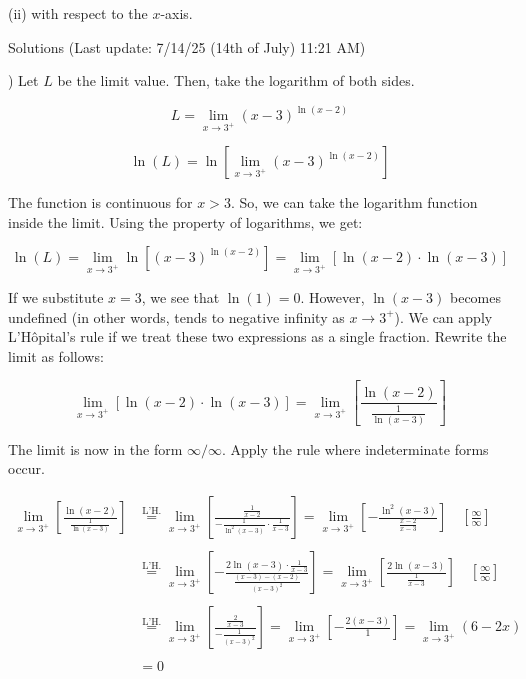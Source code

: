 \documentclass{article}
\begin{document}
\noindent (ii) with respect to the $x$-axis.

\hfill

\newpage

\begin{center}
Solutions (Last update: 7/14/25 (14th of July) 11:21 AM)
\end{center}

) Let $L$ be the limit value. Then, take the logarithm of both sides.

\begin{equation*}L = \lim_{x\to3^+}(x-3)^{\ln(x-2)}\end{equation*}

\begin{equation*}\ln(L) = \ln\left[\lim_{x\to3^+}(x-3)^{\ln(x-2)}\right]\end{equation*}

\hfill

\noindent The function is continuous for $x > 3$. So, we can take the logarithm function inside the limit. Using the property of logarithms, we get:

\begin{equation*}\ln(L) = \lim_{x\to3^+}\ln\left[(x-3)^{\ln(x-2)}\right] = \lim_{x\to3^+}\left[\ln(x-2)\cdot \ln(x-3)\right]\end{equation*}

\hfill

\noindent If we substitute $x=3$, we see that $\ln(1) = 0$. However, $\ln(x-3)$ becomes undefined (in other words, tends to negative infinity as $x\to3^+$). We can apply L'Hôpital's rule if we treat these two expressions as a single fraction. Rewrite the limit as follows:

\begin{equation*}\lim_{x\to3^+}\left[\ln(x-2) \cdot \ln(x-3)\right] =\lim_{x\to3^+}\left[\frac{\ln(x-2)}{\frac{1}{\ln(x-3)}}\right]  \end{equation*}

\hfill

\noindent The limit is now in the form $\infty/\infty$. Apply the rule where indeterminate forms occur.

\begin{align*}
    \lim_{x\to3^+}\left[\frac{\ln(x-2)}{\frac{1}{\ln(x-3)}}\right] &\overset{\text{L'H.}}{=} \lim_{x\to3^+} \left[\frac{\frac{1}{x-2}}{-\frac{1}{\ln^2(x-3)}\cdot {\frac{1}{x-3}}}\right] = \lim_{x\to3^+} \left[-\frac{\ln^2(x-3)}{\frac{x-2}{x-3}}\right] \quad \left[\frac{\infty}{\infty}\right] \\\\
    &\overset{\text{L'H.}}{=} \lim_{x\to3^+}\left[-\frac{2\ln(x-3)\cdot\frac{1}{x-3}}{\frac{(x-3) -(x-2)}{(x-3)^2}}\right] = \lim_{x\to3^+} \left[\frac{2\ln(x-3)}{\frac{1}{x-3}}\right] \quad \left[\frac{\infty}{\infty}\right] \\\\
    &\overset{\text{L'H.}}{=} \lim_{x\to3^+} \left[\frac{\frac{2}{x-3}}{-\frac{1}{(x-3)^2}}\right] = \lim_{x\to3^+} \left[-\frac{2(x-3)}{1}\right] = \lim_{x\to3^+} (6-2x)\\\\&=0
\end{align*}
\end{document}
